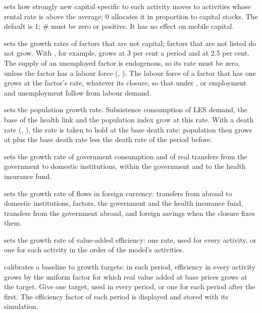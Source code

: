 \begin{optdesc}
\item[\optarg{sens}{itivity}{\#}] sets how strongly new capital specific to
each activity moves to activities whose rental rate is above the average; 0
allocates it in proportion to capital stocks. The default is 1; \# must be
zero or positive. It has no effect on mobile capital.

\item[\optarg{grow}{th}{factor\texttt{:}rate \ldots}] sets the growth rates of
factors that are not capital; factors that are not listed do not grow. With
, for example,  grows at 3 per
cent a period and  at 2.5 per cent. The supply of an unemployed factor is
endogenous, so its rate must be zero, unless the factor has a labour force
(, ). The labour force of a factor
that has one grows at the factor's rate, whatever its closure, so that under
,  or  employment and
unemployment follow from labour demand.

\item[\optarg{pop}{ulation}{\#}] sets the population growth rate. Subsistence
consumption of LES demand, the base of the health link and the population
index grow at this rate. With a death rate (\mbox{},
), the rate is taken to hold at the base death rate:
population then grows at  plus the base death rate less the
death rate of the period before.

\item[\optarg{gov}{growth}{\#}] sets the growth rate of government
consumption and of real transfers from the government to domestic
institutions, within the government and to the health insurance fund.

\item[\optarg{for}{eigngrowth}{\#}] sets the growth rate of flows in foreign
currency: transfers from abroad to domestic institutions, factors, the
government and the health insurance fund, transfers from the government
abroad, and foreign savings when the closure fixes them.

\item[\optarg{}{tfp}{numlist}] sets the growth rate of value-added efficiency:
one rate, used for every activity, or one for each activity in the order of
the model's activities.

\item[\optarg{gdp}{growth}{numlist}] calibrates a baseline to growth targets:
in each period, efficiency in every activity grows by the uniform factor for
which real value added at base prices grows at the target. Give one target,
used in every period, or one for each period after the first. The efficiency
factor of each period is displayed and stored with its simulation.


\end{optdesc}
